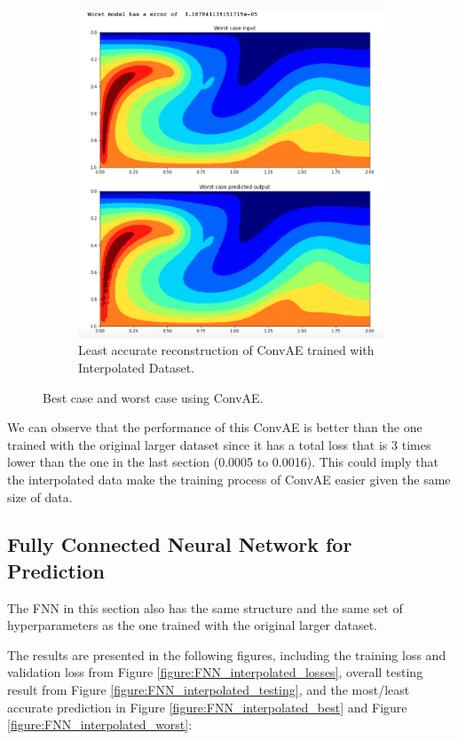 \begin{figure}[H]
\begin{subfigure}{0.45\textwidth}
    \includegraphics[width=\textwidth]{figures/mantle_convection_images/larger_dataset_interpolated/ConvAE_Worst.png}
    \caption{Least accurate reconstruction of ConvAE trained with Interpolated Dataset.}
\end{subfigure}
\caption{Best case and worst case using ConvAE.}
\label{figure:ConvAE_interpolated_best_worst}
\end{figure}

We can observe that the performance of this ConvAE is better than the one trained with the original larger dataset since it has a total loss that is 3 times lower than the one in the last section (0.0005 to 0.0016). This could imply that the interpolated data make the training process of ConvAE easier given the same size of data. 


\subsection{Fully Connected Neural Network for Prediction}

The FNN in this section also has the same structure and the same set of hyperparameters as the one trained with the original larger dataset.

The results are presented in the following figures, including the training loss and validation loss from Figure \ref{figure:FNN_interpolated_losses}, overall testing result from Figure \ref{figure:FNN_interpolated_testing}, and the most/least accurate prediction in Figure \ref{figure:FNN_interpolated_best} and Figure \ref{figure:FNN_interpolated_worst}:

